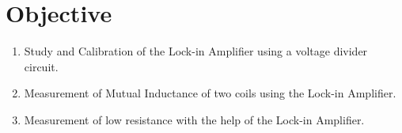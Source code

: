 \section{Objective}

\begin{enumerate}
    \item Study and Calibration of the Lock-in Amplifier using a voltage divider circuit.
    \item Measurement of Mutual Inductance of two coils using the Lock-in Amplifier.
    \item Measurement of low resistance with the help of the Lock-in Amplifier. 
\end{enumerate}